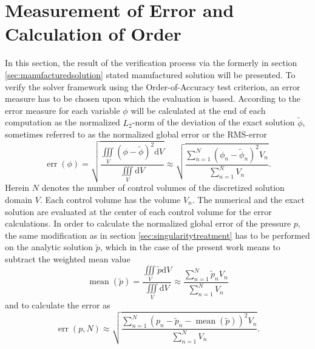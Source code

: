 \section{Measurement of Error and Calculation of Order}
\label{sec:error}

In this section, the result of the verification process via the formerly in section \ref{sec:manufacturedsolution} stated manufactured solution will be presented. To verify the solver framework using the Order-of-Accuracy test criterion, an error measure has to be chosen upon which the evaluation is based. According to \cite{salari00} the error measure for each variable \(\phi\) will be calculated at the end of each computation as the normalized \(L_2\)-norm of the deviation of the exact solution \(\tilde{\phi}\), sometimes referred to as the normalized global error or the RMS-error
\begin{displaymath}
  \operatorname{err}(\phi) = \sqrt{ \frac {\iiint\limits_V \left( \phi - \tilde{\phi} \right)^2 \mathrm{d}V }{\iiint\limits_V \mathrm{d}V }} \approx \sqrt{ \frac{ \sum_{n=1}^N \left(\phi_n - \tilde{\phi}_n \right)^2 V_n }{\sum_{n=1}^{N} V_n}} .
\end{displaymath}
Herein \(N\) denotes the number of control volumes of the discretized solution domain \(V\). Each control volume has the volume \(V_n\). The numerical and the exact solution are evaluated at the center of each control volume for the error calculations. In order to calculate the normalized global error of the pressure \(p\), the same modification as in section \ref{sec:singularitytreatment} has to be performed on the analytic solution \(\tilde{p}\), which in the case of the present work means to subtract the weighted mean value
\begin{displaymath}
  \operatorname{mean}\left( \tilde{p} \right) = \frac{\iiint\limits_V \tilde{p} \mathrm{d}V}{\iiint\limits_V \mathrm{d}V} \approx \frac{\sum_{n=1}^N \tilde{p}_n V_n}{\sum_{n=1}^N V_n}
\end{displaymath}
and to calculate the error as
\begin{displaymath}
  \operatorname{err}(p,N) \approx \sqrt{ \frac{ \sum_{n=1}^N \left(p_n - \tilde{p}_n -\operatorname{mean}\left(\tilde{p}\right) \right)^2 V_n }{\sum_{n=1}^{N} V_n}}.
\end{displaymath}
